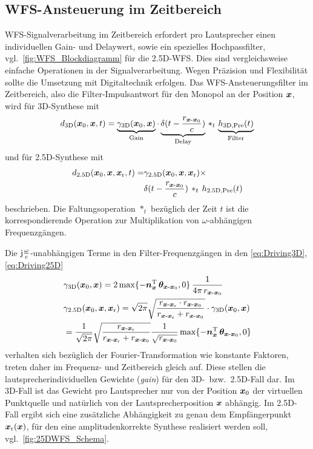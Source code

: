 \subsection{WFS-Ansteuerung im Zeitbereich}
\label{sec:WFS_Ansteuerung_im_Zeitbereich}
%
WFS-Signalverarbeitung im Zeitbereich erfordert pro Lautsprecher
einen individuellen Gain- und Delaywert, sowie ein spezielles Hochpassfilter,
vgl.~\Abb\ref{fig:WFS_Blockdiagramm} für die 2.5D-WFS.
%
Dies sind vergleichsweise einfache Operationen in der Signalverarbeitung.
%
Wegen Präzision und Flexibilität sollte die Umsetzung mit Digitaltechnik
erfolgen.
%
Das WFS-Ansteuerungsfilter im Zeitbereich, also die
Filter-Impulsantwort für den Monopol an der
Position $\bm{x}$, wird für 3D-Synthese mit
\begin{align}
d_\text{3D}(\bm{x}_\mathrm{0},\bm{x}, t) =
\underbrace{\gamma_\text{3D}(\bm{x}_\mathrm{0},\bm{x})}_{\text{Gain}} \cdot
\underbrace{\delta(t-\frac{r_{\bm{x}\text{-}\bm{x}_\mathrm{0}}}{c})}_{\text{Delay}} \,\ast_t\,
\underbrace{h_\text{3D,Pre}(t)}_{\text{Filter}}
\end{align}
und für 2.5D-Synthese mit
\begin{align}
d_\text{2.5D}(\bm{x}_\mathrm{0},\bm{x},\bm{x}_\mathrm{r}, t) =
&\gamma_\text{2.5D}(\bm{x}_\mathrm{0},\bm{x},\bm{x}_\mathrm{r}) \times\nonumber\\
&\delta(t-\frac{r_{\bm{x}\text{-}\bm{x}_\mathrm{0}}}{c}) \,\ast_t\,
h_\text{2.5D,Pre}(t)
\label{eq:h25d_time}
\end{align}
beschrieben.
%
Die Faltungsoperation $\ast_t$ bezüglich der Zeit $t$ ist die
korrespondierende Operation zur Multiplikation von $\omega$-abhängigen
Frequenzgängen.



Die $\im\frac{\omega}{c}$-unabhängigen Terme in den Filter-Frequenzgängen
in den \Glgn\eqref{eq:Driving3D}, \eqref{eq:Driving25D}
%
\begin{align}
&\gain_\text{3D}(\xp,\xs) = 2 \, \mathrm{max}\{-\nxT \, \bm{\theta}_{\xs\text{-}\xp}, 0\} \, \frac{1}{4\pi \, r_{\xs\text{-}\xp}}\\
%
&\gain_\text{2.5D}(\xp,\xs,\xr) =
\sqrt{2\pi}
\sqrt{\frac{r_{\xs\text{-}\xr} \cdot r_{\xs\text{-}\xp}}{r_{\xs\text{-}\xr} + r_{\xs\text{-}\xp}}}
\cdot \gain_\text{3D}(\xp,\xs)\nonumber\\
&={\frac{1}{\sqrt{2\pi}}}
\sqrt{\frac{r_{\xs\text{-}\xr}}{r_{\xs\text{-}\xr} + r_{\xs\text{-}\xp}}} \frac{1}{\sqrt{r_{\xs\text{-}\xp}}}
\,\mathrm{max}\{-\nxT \, \bm{\theta}_{\xs\text{-}\xp}, 0\}
\end{align}
%
verhalten sich bezüglich der Fourier-Transformation wie konstante Faktoren, treten
daher im Frequenz- und Zeitbereich gleich auf.
%
Diese stellen die lautsprecherindividuellen Gewichte (\textit{gain}) für den
3D-~bzw.~2.5D-Fall dar.
%
Im 3D-Fall ist das Gewicht pro Lautsprecher nur von der Position $\bm{x}_\mathrm{0}$  der
virtuellen Punktquelle und natürlich von der Lautsprecherposition $\bm{x}$ abhängig.
%
Im 2.5D-Fall ergibt sich eine zusätzliche Abhängigkeit zu genau dem Empfängerpunkt
$\bm{x}_\mathrm{r}(\bm{x})$, für den eine amplitudenkorrekte Synthese realisiert werden soll,
vgl.~\Abb\ref{fig:25DWFS_Schema}.



